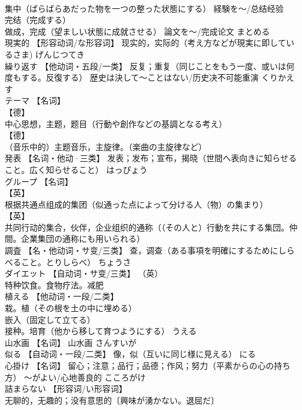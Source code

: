 \documentclass[8pt]{extreport}
\begin{document}
\begin{CJK}{UTF8}{min}
\\	集中（ばらばらあだった物を一つの整った状態にする） 経験を～/总结经验 
\\	完结（完成する） 
\\	做成，完成（望ましい状態に成就させる） 論文を～/完成论文	まとめる	
\\	現実的	【形容动词/な形容词】 现实的，实际的（考え方などが現実に即しているさま)	げんじつてき	
\\	繰り返す	【他动词・五段/一类】 反复；重复（同じことをもう一度、或いは何度もする。反復する） 歴史は決して～ことはない/历史决不可能重演	くりかえす	
\\	テーマ	【名词】 
\\	【德】
\\	中心思想，主题，题目（行動や創作などの基調となる考え） 
\\	【德】
\\	（音乐中的）主题音乐，主旋律。（楽曲の主旋律など）		
\\	発表	【名词・他动·三类】 发表；发布；宣布，揭晓（世間へ表向きに知らせること。広く知らせること）	はっぴょう	
\\	グループ	【名词】 
\\	【英】
\\	根据共通点组成的集团（似通った点によって分ける人（物）の集まり） 
\\	【英】
\\	共同行动的集合，伙伴，企业组织的通称（（その人と）行動を共にする集団。仲間。企業集団の通称にも用いられる）		
\\	調査	【名・他动词・サ变/三类】 查，调查（ある事項を明確にするためにしらべること。とりしらべ）	ちょうさ	
\\	ダイエット	【自动词・サ变/三类】 （英）
\\	特种饮食。食物疗法。减肥		
\\	植える	【他动词・一段/二类】 
\\	栽。植（その根を土の中に埋める） 
\\	嵌入（固定して立てる） 
\\	接种。培育（他から移して育つようにする）	うえる	
\\	山水画	【名词】 山水画	さんすいが	
\\	似る	【自动词・一段/二类】 像，似（互いに同じ様に見える）	にる	
\\	心掛け	【名词】 留心；注意；品行；品德；作风；努力（平素からの心の持ち方） ～がよい/心地善良的	こころがけ	
\\	詰まらない	【形容词/い形容词】 
\\	无聊的，无趣的；没有意思的〔興味が湧かない。退屈だ〕 

\end{CJK}
\end{document}
